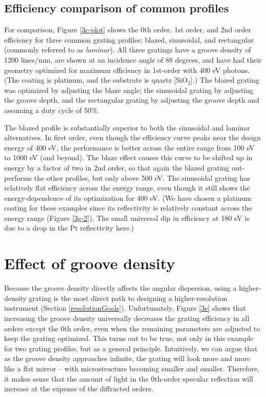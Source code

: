 \subsection{Efficiency comparison of common profiles}
For comparison, Figure \ref{3c-plot} shows the 0th order, 1st order, and 2nd order efficiency for three common grating profiles: blazed, sinusoidal, and rectangular (commonly referred to as \emph{laminar}).  All three gratings have a groove density of 1200 lines/mm, are shown at an incidence angle of 88 degrees, and have had their geometry optimized for maximum efficiency in 1st-order with 400 eV photons.  (The coating is platinum, and the substrate is quartz [SiO$_2$].)  The blazed grating was optimized by adjusting the blaze angle; the sinusoidal grating by adjusting the groove depth, and the rectangular grating by adjusting the groove depth and assuming a duty cycle of 50\%.

The blazed profile is substantially superior to both the sinusoidal and laminar alternatives.  In first order, even though the efficiency curve peaks near the design energy of 400 eV, the performance is better across the entire range from 100 eV to 1000 eV (and beyond).  The blaze effect causes this curve to be shifted up in energy by a factor of two in 2nd order, so that again the blazed grating out-performs the other profiles, but only above 500 eV.  The sinusoidal grating has relatively flat efficiency across the energy range, even though it still shows the energy-dependence of its optimization for 400 eV.   (We have chosen a platinum coating for these examples since its reflectivity is relatively constant across the energy range (Figure \ref{3g-2}).  The small universal dip in efficiency at 180 eV is due to a drop in the Pt reflectivity here.)

\section{Effect of groove density}
Because the groove density directly affects the angular dispersion, using a higher-density grating is the most direct path to designing a higher-resolution instrument (Section \ref{resolutionGoals}).  Unfortunately, Figure \ref{3e} shows that increasing the groove density universally decreases the grating efficiency in all orders except the 0th order, even when the remaining parameters are adjusted to keep the grating optimized.  This turns out to be true, not only in this example for two grating profiles, but as a general principle.  Intuitively, we can argue that as the groove density approaches infinite, the grating will look more and more like a flat mirror -- with microstructure becoming smaller and smaller.  Therefore, it makes sense that the amount of light in the 0th-order specular reflection will increase at the expense of the diffracted orders.


